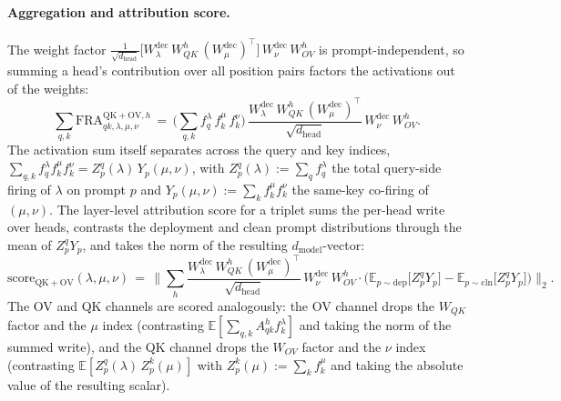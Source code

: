 \documentclass{article}
\theoremstyle{plain}
\theoremstyle{definition}
\theoremstyle{remark}
\newcommand{\Wdec}{W^{\mathrm{dec}}}
\newcommand{\WOV}{W_{OV}}
\newcommand{\WQK}{W_{QK}}
\newcommand{\dmodel}{d_{\mathrm{model}}}
\newcommand{\dhead}{d_{\mathrm{head}}}
\begin{document}
\paragraph{Aggregation and attribution score.} The weight factor $\tfrac{1}{\sqrt{\dhead}}\big[\Wdec_\lambda\, \WQK^h\, (\Wdec_\mu)^\top\big]\,\Wdec_\nu\, \WOV^h$ is prompt-independent, so summing a head's contribution over all position pairs factors the activations out of the weights:
\begin{equation}
    \sum_{q,k} \mathrm{FRA}^{\mathrm{QK{+}OV}, h}_{qk, \lambda, \mu, \nu} \,=\, \Big(\textstyle\sum_{q,k} f_q^\lambda\, f_k^\mu\, f_k^\nu\Big)\, \frac{\Wdec_\lambda\, \WQK^h\, (\Wdec_\mu)^\top}{\sqrt{\dhead}}\, \Wdec_\nu\, \WOV^h.
\end{equation}
The activation sum itself separates across the query and key indices, $\sum_{q,k} f_q^\lambda f_k^\mu f_k^\nu = Z^q_p(\lambda)\, Y_p(\mu, \nu)$, with $Z^q_p(\lambda) := \sum_q f_q^\lambda$ the total query-side firing of $\lambda$ on prompt $p$ and $Y_p(\mu, \nu) := \sum_k f_k^\mu f_k^\nu$ the same-key co-firing of $(\mu, \nu)$. The layer-level attribution score for a triplet sums the per-head write over heads, contrasts the deployment and clean prompt distributions through the mean of $Z^q_p Y_p$, and takes the norm of the resulting $\dmodel$-vector:
\begin{equation}
    \mathrm{score}_{\mathrm{QK{+}OV}}(\lambda, \mu, \nu) \,=\, \bigg\lVert \sum_h \frac{\Wdec_\lambda\, \WQK^h\, (\Wdec_\mu)^\top}{\sqrt{\dhead}}\, \Wdec_\nu\, \WOV^h \cdot \Big(\mathbb{E}_{p \sim \mathrm{dep}}\big[Z^q_p Y_p\big] - \mathbb{E}_{p \sim \mathrm{cln}}\big[Z^q_p Y_p\big]\Big) \bigg\rVert_2.
\end{equation}
The OV and QK channels are scored analogously: the OV channel drops the $\WQK$ factor and the $\mu$ index (contrasting $\mathbb{E}[\sum_{q,k} A^h_{qk} f_k^\lambda]$ and taking the norm of the summed write), and the QK channel drops the $\WOV$ factor and the $\nu$ index (contrasting $\mathbb{E}[Z^q_p(\lambda)\, Z^k_p(\mu)]$ with $Z^k_p(\mu) := \sum_k f_k^\mu$ and taking the absolute value of the resulting scalar).
\end{document}
